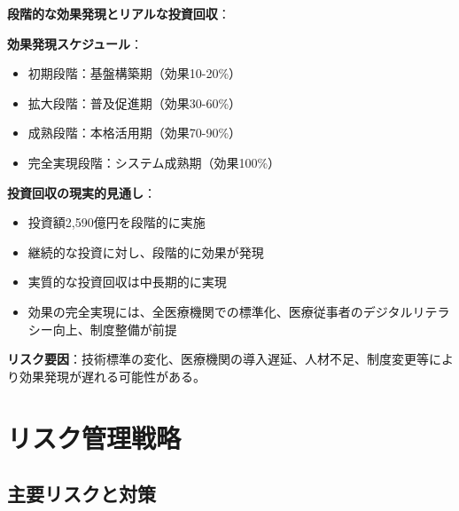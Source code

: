 \documentclass[
  a4paper,
  a4paper,
  11pt]{ltjsbook}
\providecommand{\tightlist}{%
  \setlength{\itemsep}{0pt}\setlength{\parskip}{0pt}}
\begin{document}
\begin{tcolorbox}[enhanced jigsaw, toprule=.15mm, bottomtitle=1mm, coltitle=black, left=2mm, opacityback=0, arc=.35mm, colbacktitle=quarto-callout-note-color!10!white, colback=white, opacitybacktitle=0.6, bottomrule=.15mm, rightrule=.15mm, breakable, title=\textcolor{quarto-callout-note-color}{\faInfo}\hspace{0.5em}{Note}, toptitle=1mm, titlerule=0mm, colframe=quarto-callout-note-color-frame, leftrule=.75mm]

\textbf{段階的な効果発現とリアルな投資回収}：

\textbf{効果発現スケジュール}：

\begin{itemize}
\tightlist
\item
  初期段階：基盤構築期（効果10-20\%）
\item
  拡大段階：普及促進期（効果30-60\%）
\item
  成熟段階：本格活用期（効果70-90\%）
\item
  完全実現段階：システム成熟期（効果100\%）
\end{itemize}

\textbf{投資回収の現実的見通し}：

\begin{itemize}
\tightlist
\item
  投資額2,590億円を段階的に実施
\item
  継続的な投資に対し、段階的に効果が発現
\item
  実質的な投資回収は中長期的に実現
\item
  効果の完全実現には、全医療機関での標準化、医療従事者のデジタルリテラシー向上、制度整備が前提
\end{itemize}

\textbf{リスク要因}：技術標準の変化、医療機関の導入遅延、人材不足、制度変更等により効果発現が遅れる可能性がある。

\end{tcolorbox}

\section{リスク管理戦略}\label{ux30eaux30b9ux30afux7ba1ux7406ux6226ux7565}

\subsection{主要リスクと対策}\label{ux4e3bux8981ux30eaux30b9ux30afux3068ux5bfeux7b56}
\end{document}
